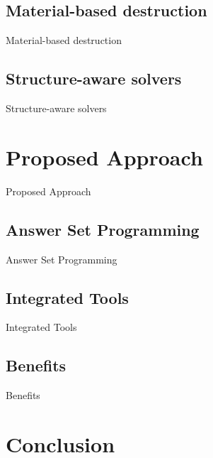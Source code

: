 \documentclass[t]{beamer}
\begin{document}
	\subsection{Material-based destruction}
		\begin{frame}{Material-based destruction}
		\end{frame}
	\subsection{Structure-aware solvers}
		\begin{frame}{Structure-aware solvers}
		\end{frame}


\section{Proposed Approach}
	\begin{frame}{Proposed Approach}
	\end{frame}
	\subsection{Answer Set Programming}
		\begin{frame}{Answer Set Programming}
		\end{frame}
	\subsection{Integrated Tools}
		\begin{frame}{Integrated Tools}
		\end{frame}

	\subsection{Benefits}
		\begin{frame}{Benefits}
		\end{frame}

\section{Conclusion}

\end{document}
